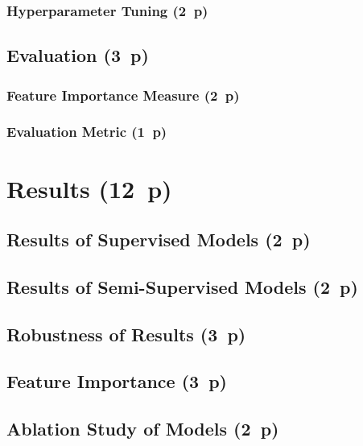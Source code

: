 \subsubsection{Hyperparameter Tuning (2~p)}\label{sec:hyperparameter-tuning}


\subsection{Evaluation (3~p)}\label{sec:evaluation}

\subsubsection{Feature Importance
  Measure (2~p)}\label{sec:feature-importance-measure}

\subsubsection{Evaluation Metric (1~p)}\label{sec:evaluation-metric}

\newpage
\section{Results (12~p)}\label{sec:results}

\subsection{Results of Supervised
  Models (2~p)}\label{sec:results-of-supervised-models}

\subsection{Results of Semi-Supervised
  Models (2~p)}\label{sec:results-of-semi-supervised-models}

\subsection{Robustness of Results (3~p)}\label{sec:robustness-checks} 
  
\subsection{Feature Importance (3~p)}\label{sec:feature-importance}

\subsection{Ablation Study of Models (2~p)}\label{sec:ablation-study}

